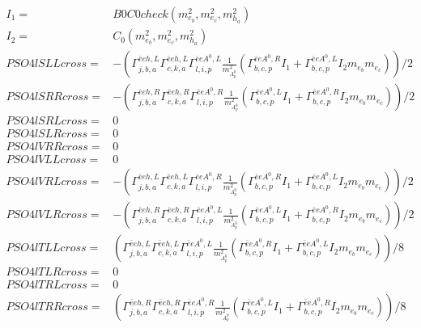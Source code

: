 \documentclass[A4,landscape]{article}
\begin{document}
\begin{align} 
I_1= & B0C0check(m^2_{e_{{b}}}, m^2_{e_{{c}}}, m^2_{h_{{a}}}) \\ 
I_2= & C_0(m^2_{e_{{b}}}, m^2_{e_{{c}}}, m^2_{h_{{a}}}) \\ 
  PSO4lSLLcross= & -( \Gamma^{\bar{e}e h ,L}_{j, b, a} \Gamma^{\bar{e}e h ,L}_{c, k, a} \Gamma^{\bar{e}e A^0 ,L}_{l, i, p} \frac{1}{m^2_{A^0_{{p}}}} (\Gamma^{\bar{e}e A^0 ,R}_{b, c, p} I_1 + \Gamma^{\bar{e}e A^0 ,L}_{b, c, p} I_2 m_{e_{{b}}} m_{e_{{c}}}))/2 \\ 
  PSO4lSRRcross= & -( \Gamma^{\bar{e}e h ,R}_{j, b, a} \Gamma^{\bar{e}e h ,R}_{c, k, a} \Gamma^{\bar{e}e A^0 ,R}_{l, i, p} \frac{1}{m^2_{A^0_{{p}}}} (\Gamma^{\bar{e}e A^0 ,L}_{b, c, p} I_1 + \Gamma^{\bar{e}e A^0 ,R}_{b, c, p} I_2 m_{e_{{b}}} m_{e_{{c}}}))/2 \\ 
  PSO4lSRLcross= & 0 \\ 
  PSO4lSLRcross= & 0 \\ 
  PSO4lVRRcross= & 0 \\ 
  PSO4lVLLcross= & 0 \\ 
  PSO4lVRLcross= & -( \Gamma^{\bar{e}e h ,L}_{j, b, a} \Gamma^{\bar{e}e h ,L}_{c, k, a} \Gamma^{\bar{e}e A^0 ,R}_{l, i, p} \frac{1}{m^2_{A^0_{{p}}}} (\Gamma^{\bar{e}e A^0 ,R}_{b, c, p} I_1 + \Gamma^{\bar{e}e A^0 ,L}_{b, c, p} I_2 m_{e_{{b}}} m_{e_{{c}}}))/2 \\ 
  PSO4lVLRcross= & -( \Gamma^{\bar{e}e h ,R}_{j, b, a} \Gamma^{\bar{e}e h ,R}_{c, k, a} \Gamma^{\bar{e}e A^0 ,L}_{l, i, p} \frac{1}{m^2_{A^0_{{p}}}} (\Gamma^{\bar{e}e A^0 ,L}_{b, c, p} I_1 + \Gamma^{\bar{e}e A^0 ,R}_{b, c, p} I_2 m_{e_{{b}}} m_{e_{{c}}}))/2 \\ 
  PSO4lTLLcross= & ( \Gamma^{\bar{e}e h ,L}_{j, b, a} \Gamma^{\bar{e}e h ,L}_{c, k, a} \Gamma^{\bar{e}e A^0 ,L}_{l, i, p} \frac{1}{m^2_{A^0_{{p}}}} (\Gamma^{\bar{e}e A^0 ,R}_{b, c, p} I_1 + \Gamma^{\bar{e}e A^0 ,L}_{b, c, p} I_2 m_{e_{{b}}} m_{e_{{c}}}))/8 \\ 
  PSO4lTLRcross= & 0 \\ 
  PSO4lTRLcross= & 0 \\ 
  PSO4lTRRcross= & ( \Gamma^{\bar{e}e h ,R}_{j, b, a} \Gamma^{\bar{e}e h ,R}_{c, k, a} \Gamma^{\bar{e}e A^0 ,R}_{l, i, p} \frac{1}{m^2_{A^0_{{p}}}} (\Gamma^{\bar{e}e A^0 ,L}_{b, c, p} I_1 + \Gamma^{\bar{e}e A^0 ,R}_{b, c, p} I_2 m_{e_{{b}}} m_{e_{{c}}}))/8 \\ 
\end{align} 
\end{document}
